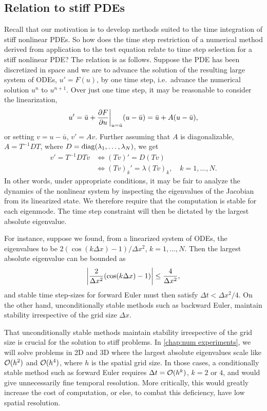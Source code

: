 \subsection{Relation to stiff PDEs}
Recall that our motivation is to develop methods suited to the time integration of stiff nonlinear PDEs. So how does the time step restriction of a numerical method derived from application to the test equation relate to time step selection for a stiff nonlinear PDE? The relation is as follows. Suppose the PDE has been discretized in space and we are to advance the solution of the resulting large system of ODEs, $u' = F(u)$, by one time step, i.e.\ advance the numerical solution $u^n$ to $u^{n+1}$. Over just one time step, it may be reasonable to consider the linearization, 
\begin{align*}
        u' = \bar u + \frac{\partial F}{\partial u} \bigg|_{u=\bar u} (u-\bar u)
= \bar u + A(u-\bar u), 
\end{align*}
or setting $v=u-\bar u$, $v' = Av$. Further assuming that $A$ is diagonalizable, $A=T^{-1}DT$, where $D=\operatorname{diag}(\lambda_1,\dots,\lambda_N)$, we get 
\begin{align}
        v' = T^{-1}DTv 
&\iff (Tv)' = D(Tv)
\\&\iff (Tv)_k' = \lambda (Tv)_k, \quad k=1,\dots, N.
\end{align}
In other words, under appropriate conditions, it may be fair to analyze the dynamics of the nonlinear system by inspecting the eigenvalues of the Jacobian from its linearized state. We therefore require that the computation is stable for each eigenmode. The time step constraint will then be dictated by the largest absolute eigenvalue.

For instance, suppose we found, from a linearized system of ODEs, the eigenvalues to be $2(\cos(k\Delta x) -1)/\Delta x^2$, $k=1,\dots,N$. Then the largest absolute eigenvalue can be bounded as 
\begin{align}
    \left|\frac{2}{\Delta x^2}(\cos(k\Delta x) -1)\right| \leq \frac{4}{\Delta x^2},
\end{align}
and stable time step-sizes for forward Euler must then satisfy $\Delta t < \Delta x^2/4$. On the other hand, unconditionally stable methods such as backward Euler, maintain stability irrespective of the grid size $\Delta x$.

That unconditionally stable methods maintain stability irrespective of the grid size is crucial for the solution to stiff problems. In \cref{chap:num experiments}, we will solve problems in 2D and 3D where the largest absolute eigenvalues scale like $\mathcal{O}(h^2)$ and $\mathcal{O}(h^4)$, where $h$ is the spatial grid size. In those cases, a conditionally stable method such as forward Euler requires $\Delta t = \mathcal{O}(h^k)$, $k= 2$ or $4$, and would give unnecessarily fine temporal resolution.  More critically, this would greatly increase the cost of computation, or else, to combat this deficiency, have low spatial resolution.

